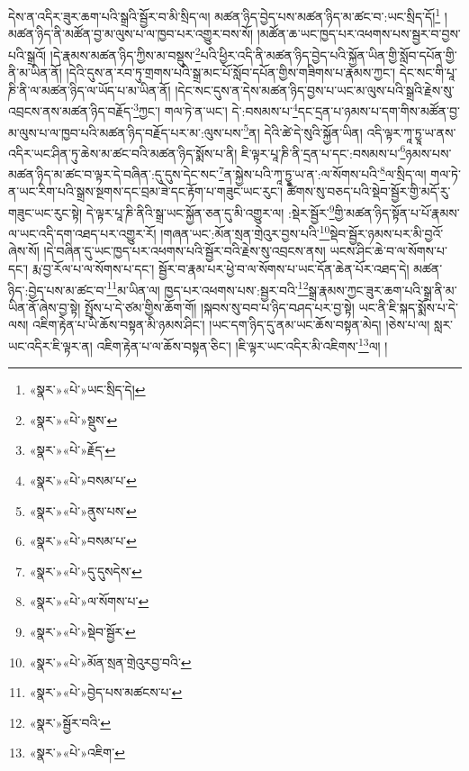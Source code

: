 དེས་ན་འདིར་ཟུར་ཆག་པའི་སྒྲའི་སྦྱོར་བ་མི་སྲིད་ལ། མཚན་ཉིད་བྱེད་པས་མཚན་ཉིད་མ་ཚང་བ་:ཡང་སྲིད་དོ།\footnote{«སྣར་»«པེ་»ཡང་སྲིད་དེ།} །མཚན་ཉིད་ནི་མཚོན་བྱ་མ་ལུས་པ་ལ་ཁྱབ་པར་འགྱུར་བས་སོ། །མཚོན་ཆ་ཡང་ཁྱད་པར་འཕགས་པས་སྦྱར་བ་བྱས་པའི་སྒྲའོ། །དེ་རྣམས་མཚན་ཉིད་ཀྱིས་མ་བསྡུས་\footnote{«སྣར་»«པེ་»སྡུས་}པའི་ཕྱིར་འདི་ནི་མཚན་ཉིད་བྱེད་པའི་སྐྱོན་ཡིན་གྱི་སློབ་དཔོན་གྱི་ནི་མ་ཡིན་ནོ། །དེའི་དུས་ན་རབ་ཏུ་གྲགས་པའི་སྒྲ་མང་པོ་སློབ་དཔོན་གྱིས་གཟིགས་པ་རྣམས་ཀྱང་། དེང་སང་གི་པཱ་ཎི་ནི་ལ་མཚན་ཉིད་ལ་ཡོད་པ་མ་ཡིན་ནོ། །དེང་སང་དུས་ན་དེས་མཚན་ཉིད་བྱས་པ་ཡང་མ་ལུས་པའི་སྒྲའི་རྗེས་སུ་འབྲངས་ནས་མཚན་ཉིད་བརྗོད་\footnote{«སྣར་»«པེ་»རྗོད་}ཀྱང་། གལ་ཏེ་ན་ཡང་། དེ་:བསམས་པ་\footnote{«སྣར་»«པེ་»བསམ་པ་}དང་དྲན་པ་ཉམས་པ་དག་གིས་མཚོན་བྱ་མ་ལུས་པ་ལ་ཁྱབ་པའི་མཚན་ཉིད་བརྗོད་པར་མ་:ལུས་པས་\footnote{«སྣར་»«པེ་»ནུས་པས་}ན། དེའི་ཚེ་དེ་སུའི་སྐྱོན་ཡིན། འདི་ལྟར་ཀཱ་ཏྱཱ་ཡ་ནས་འདིར་ཡང་ཤིན་ཏུ་ཆེས་མ་ཚང་བའི་མཚན་ཉིད་སྨོས་པ་ནི། ཇི་ལྟར་པཱ་ཎི་ནི་དྲན་པ་དང་:བསམས་པ་\footnote{«སྣར་»«པེ་»བསམ་པ་}ཉམས་པས་མཚན་ཉིད་མ་ཚང་བ་ལྟར་དེ་བཞིན་:དུ་དུས་དེང་སང་\footnote{«སྣར་»«པེ་»དུ་དུསདེས་}ན་སྐྱེས་པའི་ཀཱ་ཏྱཱ་ཡ་ན་:ལ་སོགས་པའི་\footnote{«སྣར་»«པེ་»ལ་སོགས་པ་}ལ་སྲིད་ལ། གལ་ཏེ་ན་ཡང་རིག་པའི་སྒྲས་སྔགས་དང་བྲམ་ཟེ་དང་རྟོག་པ་གཟུང་ཡང་རུང་། ཚིགས་སུ་བཅད་པའི་སྡེབ་སྦྱོར་གྱི་མདོ་རུ་གཟུང་ཡང་རུང་སྟེ། དེ་ལྟར་པཱ་ཎི་ནིའི་སྒྲ་ཡང་སྐྱོན་ཅན་དུ་མི་འགྱུར་ལ། :སྡེར་སྦྱོར་\footnote{«སྣར་»«པེ་»སྡེབ་སྦྱོར་}གྱི་མཚན་ཉིད་སྟོན་པ་པོ་རྣམས་ལ་ཡང་འདི་དག་འཐད་པར་འགྱུར་རོ། །གཞན་ཡང་:མོན་སྲན་གྲེའུར་བྱས་པའི་\footnote{«སྣར་»«པེ་»མོན་སྲན་གྲེའུརབྱ་བའི་}སྡེབ་སྦྱོར་ཉམས་པར་མི་བྱའོ་ཞེས་སོ། །དེ་བཞིན་དུ་ཡང་ཁྱད་པར་འཕགས་པའི་སྦྱོར་བའི་རྗེས་སུ་འབྲངས་ནས། ཡངས་ཤིང་ཆེ་བ་ལ་སོགས་པ་དང་། རྨ་བྱ་རོལ་པ་ལ་སོགས་པ་དང་། སྦྱོར་བ་རྣམ་པར་ཕྱེ་བ་ལ་སོགས་པ་ཡང་དོན་ཆེན་པོར་འཐད་དེ། མཚན་ཉིད་:བྱེད་པས་མ་ཚང་བ་\footnote{«སྣར་»«པེ་»བྱེད་པས་མཚངས་པ་}མ་ཡིན་ལ། ཁྱད་པར་འཕགས་པས་:སྦྱར་བའི་\footnote{«སྣར་»སྦྱོར་བའི་}སྒྲ་རྣམས་ཀྱང་ཟུར་ཆག་པའི་སྒྲ་ནི་མ་ཡིན་ནོ་ཞེས་བྱ་སྟེ། སྤྲོས་པ་དེ་ཙམ་གྱིས་ཆོག་གོ། །སྐབས་སུ་བབ་པ་ཉིད་བཤད་པར་བྱ་སྟེ། ཡང་ནི་ཇི་སྐད་སྨོས་པ་དེ་ལས། འཇིག་རྟེན་པ་ཡི་ཆོས་བསྟན་མི་ཉམས་ཤིང་། །ཡང་དག་ཉིད་དུ་ནམ་ཡང་ཆོས་བསྟན་མེད། །ཅེས་པ་ལ། སླར་ཡང་འདིར་ཇི་ལྟར་ན། འཇིག་རྟེན་པ་ལ་ཆོས་བསྟན་ཅིང་། །ཇི་ལྟར་ཡང་འདིར་མི་འཇིགས་\footnote{«སྣར་»«པེ་»འཇིག་}ལ། །

